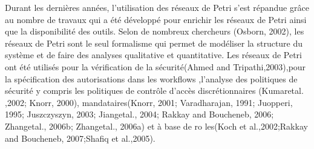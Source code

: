 Durant les dernières années, l'utilisation des réseaux de Petri s'est répandue grâce au nombre de travaux qui a été développé pour enrichir les réseaux de Petri ainsi que la disponibilité des outils. Selon de nombreux chercheurs (Osborn, 2002), les réseaux de Petri sont le seul formalisme qui permet de modéliser la structure du système et de faire des analyses qualitative et quantitative. Les réseaux de Petri ont été utilisés pour la vérification de la sécurité(Ahmed and Tripathi,2003),pour la spécification des autorisations dans les workflows \parencite{ESORICS'96},l'analyse des politiques de sécurité y compris les politiques de contrôle d'accès discrétionnaires (Kumaretal. ,2002; Knorr, 2000), mandataires(Knorr, 2001; Varadharajan, 1991; Juopperi, 1995; Juszczyszyn, 2003; Jiangetal., 2004; Rakkay and Boucheneb, 2006; Zhangetal., 2006b; Zhangetal., 2006a) et à base de ro les(Koch et al.,2002;Rakkay and Boucheneb, 2007;Shafiq et al.,2005).















